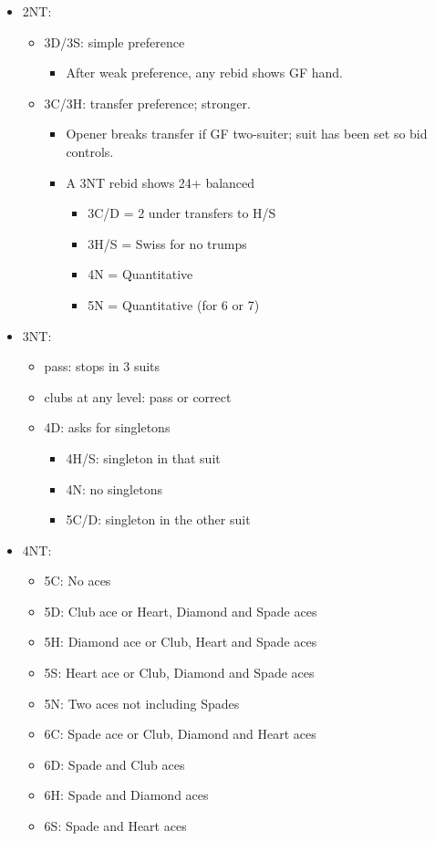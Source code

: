 \documentclass[a4paper,12pt]{article}
\begin{document}
\begin{itemize}
\item 2NT:
	\begin{itemize}
   \item 3D/3S: simple preference
		\begin{itemize}
      \item After weak preference, any rebid shows GF hand.
		\end{itemize}
   \item 3C/3H: transfer preference; stronger.
		\begin{itemize}
      \item Opener breaks transfer if GF two-suiter; suit has been set so bid controls.
      \item A 3NT rebid shows 24+ balanced
			\begin{itemize}
         \item 3C/D = 2 under transfers to H/S
         \item 3H/S = Swiss for no trumps
         \item 4N = Quantitative
         \item 5N = Quantitative (for 6 or 7)
			\end{itemize}
		\end{itemize}
	\end{itemize}

\item 3NT:
	\begin{itemize}
	\item pass: stops in 3 suits
	\item clubs at any level: pass or correct
	\item 4D: asks for singletons
		\begin{itemize}
		\item 4H/S: singleton in that suit
		\item 4N: no singletons
		\item 5C/D: singleton in the other suit
		\end{itemize}
	\end{itemize}

\newpage

\item 4NT:
	\begin{itemize}
	\item 5C: No aces
	\item 5D: Club ace or Heart, Diamond and Spade aces
	\item 5H: Diamond ace or Club, Heart and Spade aces
	\item 5S: Heart ace or Club, Diamond and Spade aces
	\item 5N: Two aces not including Spades
	\item 6C: Spade ace or Club, Diamond and Heart aces
	\item 6D: Spade and Club aces
	\item 6H: Spade and Diamond aces
	\item 6S: Spade and Heart aces
	\end{itemize}

\end{itemize}
\end{document}
